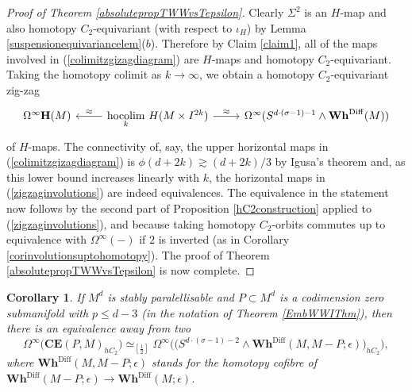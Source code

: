 \documentclass[a4paper, oneside]{amsart}
\DeclareMathOperator{\hocolim}{\operatorname{hocolim}}
\newcommand{\diff}{\mathrm{Diff}}
\newcommand{\1}{\mathds{1}}
\newtheorem{cor}[thm]{Corollary}
\theoremstyle{remark}
\theoremstyle{definition}
\newcommand{\R}{{\scaleobj{0.97}{\mathbb{R}}}}
\newcommand{\Hsp}{\mathbf{H}}
\newcommand{\CEsp}{\mathbf{CE}}
\newcommand{\Whsp}{\mathbf{Wh}^{\diff}}
\numberwithin{equation}{section}
\begin{document}
\begin{proof}[Proof of Theorem \ref{absolutepropTWWvsTepsilon}]
Clearly $\Sigma^2$ is an $H$-map and also homotopy $C_2$-equivariant (with respect to $\iota_H$) by Lemma \ref{suspensionequivariancelem}($b$). Therefore by Claim \ref{claim1}, all of the maps involved in (\ref{colimitzgizagdiagram}) are $H$-maps and homotopy $C_2$-equivariant. Taking the homotopy colimit as $k\to\infty$, we obtain a homotopy $C_2$-equivariant zig-zag
\begin{equation}\label{zigzaginvolutions}
\begin{tikzcd}
\Omega^\infty\Hsp(M)&\lar["\approx"']\underset{k}{\hocolim}\ H(M\times I^{2k})\rar["\approx"] &\Omega^\infty(S^{d\cdot(\sigma-1)-1}\wedge\Whsp(M))
    \end{tikzcd}
\end{equation}
of $H$-maps. The connectivity of, say, the upper horizontal maps in (\ref{colimitzgizagdiagram}) is $\phi(d+2k)\gtrsim (d+2k)/3$ by Igusa's theorem and, as this lower bound increases linearly with $k$, the horizontal maps in (\ref{zigzaginvolutions}) are indeed equivalences. The equivalence in the statement now follows by the second part of Proposition \ref{hC2construction} applied to (\ref{zigzaginvolutions}), and because taking homotopy $C_2$-orbits commutes up to equivalence with $\Omega^\infty(-)$ if $2$ is inverted (as in Corollary \ref{corinvolutionsuptohomotopy}). The proof of Theorem \ref{absolutepropTWWvsTepsilon} is now complete.
\end{proof}








\begin{cor}\label{propTWWvsTepsilon}
    If $M^d$ is stably paralellisable and $P\subset M^d$ is a codimension zero submanifold with $p\leq d-3$ (in the notation of Theorem \ref{EmbWWIThm}), then there is an equivalence away from two
    $$
\Omega^\infty\big(\CEsp(P,M)_{hC_2}\big)\simeq_{[\frac{1}{2}]}\Omega^\infty\big(\big(S^{d\cdot (\sigma-1)-2}\wedge\Whsp(M,M-P;\epsilon)\big)_{hC_2}\big),
    $$
    where $\Whsp(M,M-P;\epsilon)$ stands for the homotopy cofibre of $\Whsp(M-P;\epsilon)\to\Whsp(M;\epsilon)$.
\end{cor}
\end{document}
